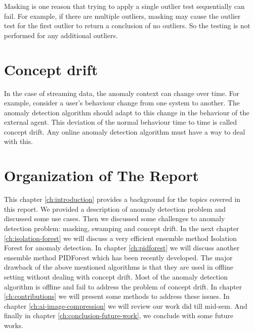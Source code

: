 Masking is one reason that trying to apply a single outlier test sequentially can fail.
For example, if there are multiple outliers, masking may cause the outlier test for the first outlier to return a conclusion of no outliers.
So the testing is not performed for any additional outliers.

\section{Concept drift}
\label{sec:concept-drift-definition}

In the case of streaming data, the anomaly context can change over time.
For example, consider a user's behaviour change from one system to another.
The anomaly detection algorithm should adapt to this change in the behaviour of the external agent.
This deviation of the normal behaviour time to time is called concept drift.
Any online anomaly detection algorithm must have a way to deal with this.


\section{Organization of The Report}
\label{sec:organization-of-the-report}

This chapter \ref{ch:introduction} provides a background for the topics covered in this report.
We provided a description of anomaly detection problem and discussed some use cases.
Then we discussed some challenges to anomaly detection problem: masking, swamping and concept drift.
In the next chapter \ref{ch:isolation-forest} we will discuss a very efficient ensemble method Isolation Forest for anomaly detection.
In chapter \ref{ch:pidforest} we will discuss another ensemble method PIDForest which has been recently developed.
The major drawback of the above mentioned algorithms is that they are used in offline setting without dealing with concept drift.
Most of the anomaly detection algorithm is offline and fail to address the problem of concept drift.
In chapter \ref{ch:contributions} we will present some methods to address these issues.
In chapter \ref{ch:ai-image-compression} we will review our work did till mid-sem.
And finally in chapter \ref{ch:conclusion-future-work}, we conclude with some future works.

